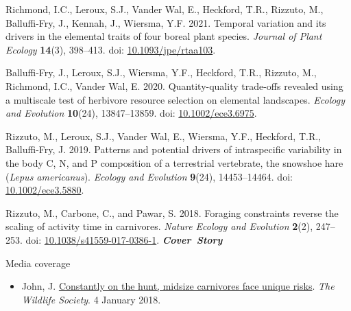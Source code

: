 \begin{etaremune}[topsep=0pt,itemsep=1pt,partopsep=0pt,parsep=0pt]
  \item Richmond, I.C., Leroux, S.J., Vander Wal, E., Heckford, T.R., \textcolor{awesome}{Rizzuto, M.}, Balluffi-Fry, J., Kennah, J., Wiersma, Y.F. 2021. Temporal variation and its drivers in the elemental traits of four boreal plant species. \emph{Journal of Plant Ecology} \textbf{14}(3), 398--413. doi: \href{https://doi.org/10.1093/jpe/rtaa103}{10.1093/jpe/rtaa103}.
  \item Balluffi-Fry, J., Leroux, S.J., Wiersma, Y.F., Heckford, T.R., \textcolor{awesome}{Rizzuto, M.}, Richmond, I.C., Vander Wal, E. 2020. Quantity-quality trade-offs revealed using a multiscale test of herbivore resource selection on elemental landscapes. \emph{Ecology and Evolution} \textbf{10}(24), 13847--13859. doi: \href{https://doi.org/10.1002/ece3.6975}{10.1002/ece3.6975}.
  \item \textcolor{awesome}{Rizzuto, M.}, Leroux, S.J., Vander Wal, E., Wiersma, Y.F., Heckford, T.R., Balluffi-Fry, J. 2019. Patterns and potential drivers of intraspecific variability in the body C, N, and P composition of a terrestrial vertebrate, the snowshoe hare (\textit{Lepus americanus}). \textit{Ecology and Evolution} \textbf{9}(24), 14453--14464. doi: \href{https://doi.org/10.1002/ece3.5880}{10.1002/ece3.5880}.
  \item \textcolor{awesome}{Rizzuto, M.}, Carbone, C., and Pawar, S. 2018. Foraging constraints reverse the scaling of activity time in carnivores. \emph{Nature Ecology and Evolution} \textbf{2}(2), 247--253. doi: \href{https://doi.org/10.1038/s41559-017-0386-1}{10.1038/s41559-017-0386-1}. \null\hfill\textbf{\textit{Cover~Story}}
  \begin{description}
    \item[\small \bodyfontlight Media coverage]
  \end{description}
  \begin{itemize}
    \footnotesize
      \item John, J. \href{https://doi.org/10.1029/2024EO240170}{Constantly on the hunt, midsize carnivores face unique risks}. \emph{The Wildlife Society}. 4 January 2018.
  \end{itemize}
\end{etaremune}

  

